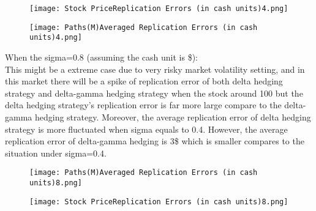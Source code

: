 \documentclass[14pt]{extarticle}
\begin{document}
\begin{figure}[h] 
    \centering 
    \texttt{[image: Stock PriceReplication Errors (in cash units)4.png]}
 \end{figure}

\begin{figure}[h] 
    \centering 
    \texttt{[image: Paths(M)Averaged Replication Errors (in cash units)4.png]}
 \end{figure}
 



When the sigma=0.8 (assuming the cash unit is \$): \\
This might be a extreme case due to very risky market volatility setting, and in this market there will be a spike of replication error of both delta hedging strategy and delta-gamma hedging strategy when the stock around 100 but the delta hedging strategy’s replication error is far more large compare to the delta-gamma hedging strategy. Moreover, the average replication error of delta hedging strategy is more fluctuated when sigma equals to 0.4. However, the average replication error of delta-gamma hedging is 3\$ which is smaller compares to the situation under sigma=0.4.


\begin{figure}[htbp] 
    \centering 
    \texttt{[image: Paths(M)Averaged Replication Errors (in cash units)8.png]}
 \end{figure}

\begin{figure}[htbp] 
    \centering 
    \texttt{[image: Stock PriceReplication Errors (in cash units)8.png]}
 \end{figure}
\end{document}

